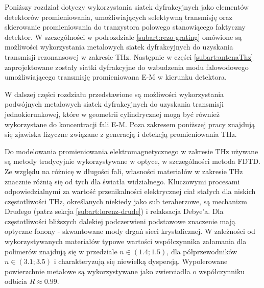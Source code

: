 Poniższy rozdział dotyczy wykorzystania siatek dyfrakcyjnych jako elementów detektorów promieniowania, umożliwiających selektywną transmisję oraz skierowanie promieniowania do tranzystora polowego stanowiącego faktyczny detektor. W szczególności w podrozdziale \ref{subart:rezo-grating} omówione są możliwości wykorzystania metalowych siatek dyfrakcyjnych do uzyskania transmisji rezonansowej w zakresie THz. Następnie w części \ref{subart:antenaThz} zaprojektowane zostały siatki dyfrakcyjne do wzbudzenia modu falowodowego umożliwiającego transmisję promieniowana E-M w kierunku detektora.

W dalszej części rozdziału przedstawione są możliwości wykorzystania podwójnych metalowych siatek dyfrakcyjnych do uzyskania transmisji jednokierunkowej, które w geometrii cylindrycznej mogą być również wykorzystane do koncentracji fali E-M. Poza zakresem poniższej pracy znajdują się zjawiska fizyczne związane z generacją i detekcją promieniowania THz.

Do modelowania promieniowania elektromagnetycznego w zakresie THz używane są metody tradycyjnie wykorzystywane w optyce, w  szczególności metoda FDTD. Ze względu na różnicę w długości fali, własności materiałów w zakresie THz znacznie różnią się od tych dla światła widzialnego. Kluczowymi procesami odpowiedzialnymi za wartość przenikalności elektrycznej ciał stałych dla niskich częstotliwości THz, określanych niekiedy jako sub teraherzowe, są mechanizm Drudego (patrz sekcja \ref{subart:lorenz-drude}) i relaksacja Debye'a. Dla częstotliwości bliższych dalekiej podczerwieni podstawowe znaczenie mają optyczne fonony - skwantowane mody drgań sieci krystalicznej. W zależności od wykorzystywanych materiałów typowe wartości współczynnika załamania dla polimerów znajdują się w przedziale $n \in (1.4;1.5)$, dla półprzewodników $n\in (3.1;3.5)$ i charakteryzują się niewielką dyspersją. Wypolerowane powierzchnie metalowe są wykorzystywane jako zwierciadła o współczynniku odbicia $R\approx 0.99$. \cite{lee2009principles}


